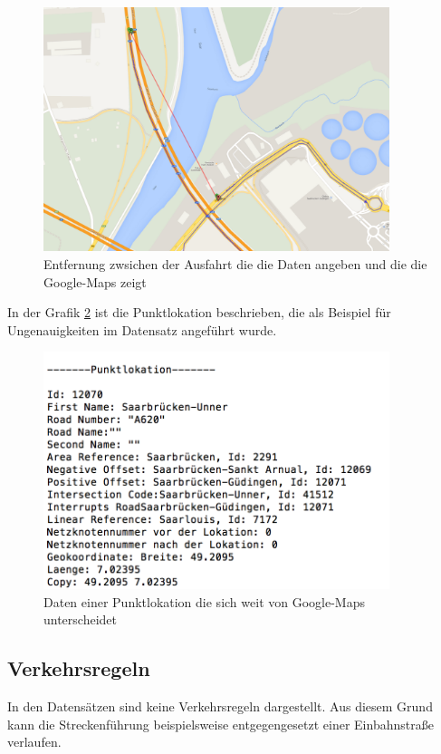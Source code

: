 \documentclass[12pt, a4paper, ngerman]{article}
\begin{document}
\begin{figure}[htbp] 
  \centering
     \includegraphics[width=0.9\textwidth]{Grafiken/entfernung.png}
  \caption{Entfernung zwsichen der Ausfahrt die die Daten angeben und die die Google-Maps zeigt}
  \label{fig:entfernungabfahrt}
\end{figure}

In der Grafik \ref{fig:entfernungabfahrtplk} ist die Punktlokation beschrieben, die als Beispiel für Ungenauigkeiten im Datensatz angeführt wurde.

\begin{figure}[htbp] 
  \centering
     \includegraphics[width=0.9\textwidth]{Grafiken/punklokationentfernung.png}
  \caption{Daten einer Punktlokation die sich weit von Google-Maps unterscheidet}
  \label{fig:entfernungabfahrtplk}
\end{figure}




\subsection{Verkehrsregeln}
In den Datensätzen sind keine Verkehrsregeln dargestellt. Aus diesem Grund kann die Streckenführung beispielsweise entgegengesetzt einer Einbahnstraße verlaufen.
\end{document}
